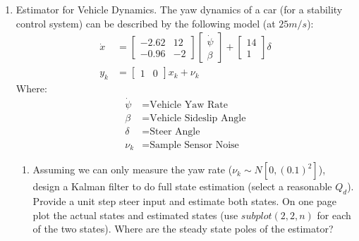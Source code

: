 \documentclass[10pt]{article}
\begin{document}
\begin{enumerate}[label=\textbf{\arabic*.}]
  \item Estimator for Vehicle Dynamics. The yaw dynamics of a car (for a 
  stability control system) can be described by the following model (at 
  $25 m/s$):
  \begin{equation*}
    \begin{split}
      \dot{x} &= 
      \begin{bmatrix}
        -2.62 & 12 \\ -0.96 & -2
      \end{bmatrix}
      \begin{bmatrix}
        \dot{\psi} \\ \beta 
      \end{bmatrix}
      + 
      \begin{bmatrix}
        14 \\ 1
      \end{bmatrix} 
      \delta \\
      y_k &= 
      \begin{bmatrix}
        1 & 0
      \end{bmatrix}
      x_k + \nu_k
    \end{split}
  \end{equation*}
  Where:
  \begin{equation*}
    \begin{split}
      \dot{\psi} &= \text{Vehicle Yaw Rate} \\
      \beta &= \text{Vehicle Sideslip Angle} \\
      \delta &= \text{Steer Angle} \\
      \nu_k &= \text{Sample Sensor Noise}
    \end{split}
  \end{equation*}
  \begin{enumerate}
    \itemsep -2pt 
    \item Assuming we can only measure the yaw rate ($\nu_k \sim N 
    [0,(0.1)^2]$), design a Kalman filter to do full state estimation (select a 
    reasonable $Q_d$). Provide a unit step steer input and estimate both states. 
    On one page plot the actual states and estimated states (use 
    $subplot(2,2,n)$ for each of the two states). Where are the steady state
    poles of the estimator?


\end{enumerate}
\end{enumerate}
\end{document}
